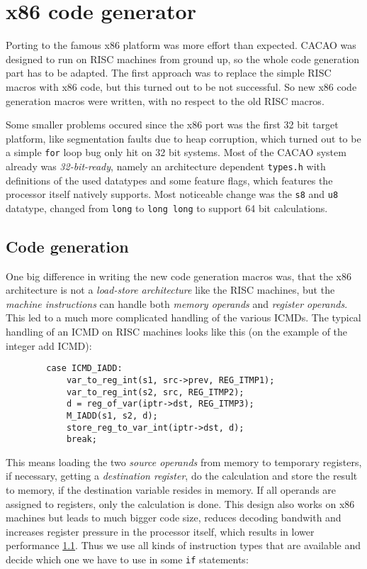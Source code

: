 \section{x86 code generator}

Porting to the famous x86 platform was more effort than
expected. CACAO was designed to run on RISC machines from ground up,
so the whole code generation part has to be adapted. The first
approach was to replace the simple RISC macros with x86 code, but this
turned out to be not successful. So new x86 code generation macros
were written, with no respect to the old RISC macros.

Some smaller problems occured since the x86 port was the first 32 bit
target platform, like segmentation faults due to heap corruption,
which turned out to be a simple \texttt{for} loop bug only hit on 32
bit systems. Most of the CACAO system already was
\textit{32-bit-ready}, namely an architecture dependent
\texttt{types.h} with definitions of the used datatypes and some
feature flags, which features the processor itself natively
supports. Most noticeable change was the \texttt{s8} and \texttt{u8}
datatype, changed from \texttt{long} to \texttt{long long} to support
64 bit calculations.


\subsection{Code generation}

One big difference in writing the new code generation macros was, that
the x86 architecture is not a \textit{load-store architecture} like
the RISC machines, but the \textit{machine instructions} can handle
both \textit{memory operands} and \textit{register operands}. This led
to a much more complicated handling of the various ICMDs. The typical
handling of an ICMD on RISC machines looks like this (on the example
of the integer add ICMD):

\begin{verbatim}
        case ICMD_IADD:
            var_to_reg_int(s1, src->prev, REG_ITMP1);
            var_to_reg_int(s2, src, REG_ITMP2);
            d = reg_of_var(iptr->dst, REG_ITMP3);
            M_IADD(s1, s2, d);
            store_reg_to_var_int(iptr->dst, d);
            break;
\end{verbatim}

This means loading the two \textit{source operands} from memory to
temporary registers, if necessary, getting a \textit{destination
register}, do the calculation and store the result to memory, if the
destination variable resides in memory. If all operands are assigned
to registers, only the calculation is done. This design also works on
x86 machines but leads to much bigger code size, reduces decoding
bandwith and increases register pressure in the processor itself,
which results in lower performance \ref{}. Thus we use all kinds of
instruction types that are available and decide which one we have to
use in some \texttt{if} statements:


